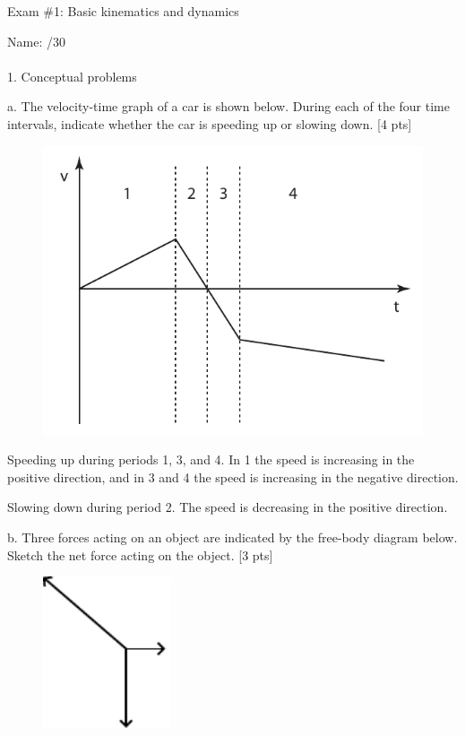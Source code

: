 \documentclass[11pt,letterpaper]{article}
\newcommand{\sol}[1]{{\color{White} #1}} %
\begin{document}
\setlength{\parindent}{0cm}
\setlength{\parskip}{11pt}
Exam \#1: Basic kinematics and dynamics

Name: \hfill /30\\

\hrulefill\\
1. Conceptual problems

a. The velocity-time graph of a car is shown below. During each of the four time intervals, indicate whether the car is speeding up or slowing down. [4 pts]
\begin{figure}[h]
\includegraphics[]{./exam1_1a}
\end{figure}

\sol{Speeding up during periods 1, 3, and 4. In 1 the speed is increasing in the positive direction, and in 3 and 4 the speed is increasing in the negative direction. 

Slowing down during period 2. The speed is decreasing in the positive direction.} 
\vspace{1cm}

b. Three forces acting on an object are indicated by the free-body diagram below. Sketch the net force acting on the object. [3 pts]
\begin{figure}[h]
\centering
\includegraphics[height=4.5cm]{./exam1_1b}
\end{figure}
\end{document}

